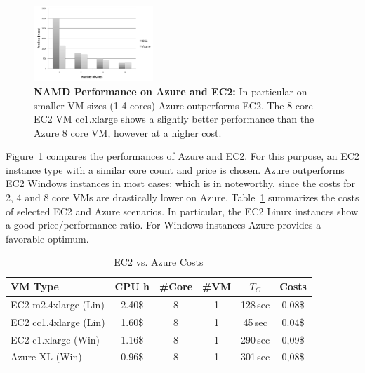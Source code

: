 \documentclass[conference,final]{IEEEtran}
\newcommand{\up}{\vspace*{-1em}}
\newcommand{\tc}{$T_{C}$ }
\begin{document}
\begin{figure}[t]
    \centering
        \includegraphics[width=0.4\textwidth]{performance/namd_ec2_azure.pdf}
    \caption{\textbf{NAMD Performance on Azure and EC2:} In particular on smaller VM sizes (1-4 cores) Azure 
    outperforms EC2. The 8 core EC2 VM cc1.xlarge shows a slightly better performance than the Azure 8 core VM,
    however at a higher cost.} %
    \label{fig:performance_namd_ec2_azure}
    \up
\end{figure}

Figure~\ref{fig:performance_namd_ec2_azure} compares the performances
of Azure and EC2. For this purpose, an EC2 instance type with a similar core
count and price is chosen. Azure outperforms EC2 Windows instances in 
most cases; which is in noteworthy, since the costs for 2, 4 and 8 core VMs are
drastically lower on Azure. Table~\ref{tbl:costs} summarizes the
costs of selected EC2 and Azure scenarios. In particular, the EC2
Linux instances show a good price/performance ratio. For Windows
instances Azure provides a favorable optimum.



\begin{table}[ht]
    \centering
	\begin{scriptsize}
		\begin{tabular}{|l|c|c|c|c|c|}
	        \hline
	        VM Type                 &CPU h  &\#Core &\#VM &\tc &Costs  \\ \hline
	        EC2 m2.4xlarge (Lin)  &2.40\$  &8          &1      &128\,sec     &0.08\$ \\ \hline
	        EC2 cc1.4xlarge (Lin) &1.60\$  &8          &1      &45\,sec     &0.04\$ \\ \hline
	        EC2 c1.xlarge   (Win)   &1.16\$  &8          &1      &290\,sec    &0,09\$ \\ \hline
	        Azure XL (Win)  &0.96\$ &8          &1      &301\,sec    &0,08\$ \\ \hline
		\end{tabular}
	\end{scriptsize}
	\caption{EC2 vs. Azure Costs\label{tbl:costs}}
	\up\up
\end{table}
\end{document}
